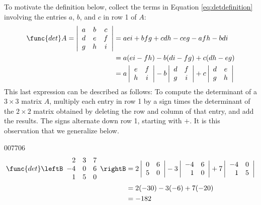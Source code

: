 To motivate the definition below, collect the terms in Equation \ref{eq:detdefinition} involving the entries $a$, $b$, and $c$ in row 1 of $A$:
\begin{align*}
\func{det } A = \left| \begin{array}{ccc}
a & b & c \\
d & e & f \\
g & h & i 
\end{array} \right| &= aei + bfg + cdh - ceg - afh - bdi \\
&= a (ei-fh) - b(di-fg) + c(dh-eg) \\
&= a \left| \begin{array}{cc}
e & f \\
h & i 
\end{array} \right| -  b \left| \begin{array}{cc}
d & f \\
g & i 
\end{array} \right|
+ c \left| \begin{array}{cc}
d & e \\
g & h 
\end{array} \right|
\end{align*}
This last expression can be described as follows: To compute the determinant of a $3 \times 3$ matrix $A$,
 multiply each entry in row 1 by a sign times the determinant of the $2 \times
 2$ matrix obtained by deleting the row and column of that entry, and add
 the results. The signs alternate down row 1, starting with $+$. It is 
this observation that we generalize below. 

\begin{example}{}{007706}
\begin{align*}
\func{det}\leftB \begin{array}{rrr}
2 & 3 & 7 \\
-4 & 0 & 6 \\
1 & 5 & 0 
 \end{array} \rightB
&= 2 \left| \begin{array}{rr}
0 & 6 \\
5 & 0 
\end{array} \right| 
- 3 \left| \begin{array}{rr}
-4 & 6 \\
1 & 0 
\end{array} \right| 
+ 7 \left| \begin{array}{rr}
-4 & 0 \\
1 & 5 
\end{array} \right| \\
&= 2 (-30) - 3(-6) + 7(-20) \\ 
&= -182
\end{align*}
\end{example}

